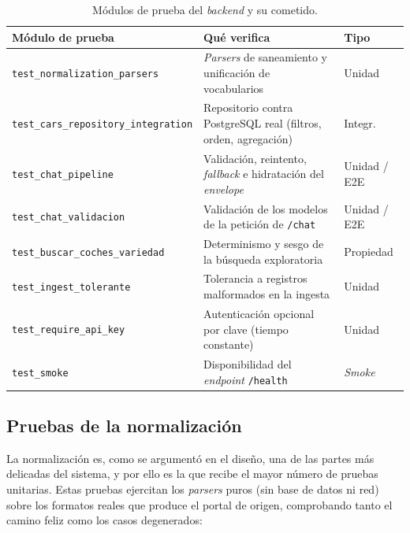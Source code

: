 \begin{table}[H]
\centering
\begin{tabular}{p{5.6cm}p{5.2cm}p{1.4cm}}
\hline
\textbf{Módulo de prueba} & \textbf{Qué verifica} & \textbf{Tipo} \\
\hline
\texttt{test\_normalization\_parsers} & \emph{Parsers} de saneamiento y
unificación de vocabularios & Unidad \\
\texttt{test\_cars\_repository\_\allowbreak integration} & Repositorio contra
PostgreSQL real (filtros, orden, agregación) & Integr. \\
\texttt{test\_chat\_pipeline} & Validación, reintento, \emph{fallback} e
hidratación del \emph{envelope} & Unidad / E2E \\
\texttt{test\_chat\_validacion} & Validación de los modelos de la petición de
\texttt{/chat} & Unidad / E2E \\
\texttt{test\_buscar\_coches\_variedad} & Determinismo y sesgo de la búsqueda
exploratoria & Propiedad \\
\texttt{test\_ingest\_tolerante} & Tolerancia a registros malformados en la
ingesta & Unidad \\
\texttt{test\_require\_api\_key} & Autenticación opcional por clave (tiempo
constante) & Unidad \\
\texttt{test\_smoke} & Disponibilidad del \emph{endpoint} \texttt{/health} &
\emph{Smoke} \\
\hline
\end{tabular}
\caption{Módulos de prueba del \emph{backend} y su cometido.}
\label{tab:test-backend}
\end{table}

\subsection{Pruebas de la normalización}
\label{sec:test-normalizacion}

La normalización es, como se argumentó en el diseño, una de las partes más
delicadas del sistema, y por ello es la que recibe el mayor número de pruebas
unitarias. Estas pruebas ejercitan los \emph{parsers} puros (sin base de datos ni
red) sobre los formatos reales que produce el portal de origen, comprobando tanto
el camino feliz como los casos degenerados:

